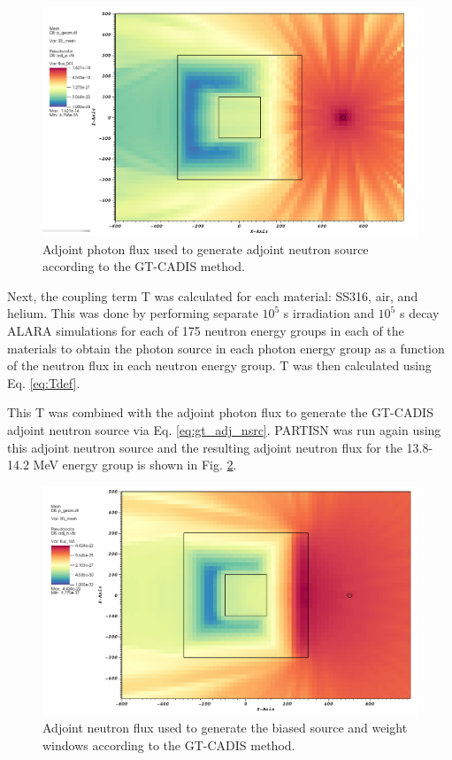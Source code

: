 \begin{figure}
	\includegraphics[scale=0.4]{figs/gtcadis_adj_p_g41.png}
	\caption [GT-CADIS adjoint photon flux] 
	{Adjoint photon flux used to generate adjoint neutron source according
	to the GT-CADIS method.\label{fig:ex.adj_p_flux}}
\end{figure}


Next, the coupling term T was calculated for each material: SS316, air, and
helium.  This was done by performing separate $10^5$ s irradiation and $10^5$ s decay
ALARA simulations for each of 175 neutron energy groups in each of the materials to 
obtain the photon source in each photon energy group as a function of the
neutron flux in each neutron energy group.  T was then calculated using 
Eq. \ref{eq:Tdef}.

This T was combined with the adjoint photon flux to generate the GT-CADIS
adjoint neutron source via Eq. \ref{eq:gt_adj_nsrc}. 
PARTISN was run again using this adjoint neutron source and the resulting
adjoint neutron flux for the 13.8-14.2 MeV energy group is shown in Fig.
\ref{fig:ex.adj_n_flux}.

\begin{figure}
	\includegraphics[scale=0.4]{figs/gtcadis_adj_n_g216.png}
	\caption [GT-CADIS adjoint neutron flux] 
	{Adjoint neutron flux used to generate the biased source and weight
	windows according to the GT-CADIS method.\label{fig:ex.adj_n_flux} }
\end{figure}

